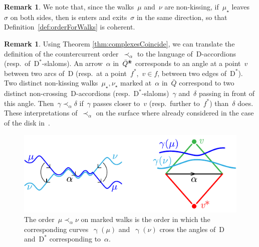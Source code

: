 \documentclass{amsart}
\theoremstyle{definition}
\newtheorem{remark}[theorem]{Remark}
\newcommand{\blossom}{^\text{\ding{96}}} %
\newcommand{\dual}{^*} %
\newcommand{\dissection}{\mathrm{D}} %
\newcommand{\curveof}{\operatorname{\gamma}} %
\begin{document}
\begin{remark}
 We note that, since the walks~$\mu$ and~$\nu$ are non-kissing, if~$\mu_\star$ leaves~$\sigma$ on both sides, then is enters and exits~$\sigma$ in the same direction, so that Definition~\ref{def:orderForWalks} is coherent.
\end{remark}


\begin{remark}
\label{rem:countercurrentOrderOnSurface}
Using Theorem \ref{thm:complexesCoincide}, we can translate the definition of the countercurrent order~$\prec_\alpha$ to the language of~$\dissection$-accordions (resp.~of~$\dissection\dual$-slaloms).
An arrow~$\alpha$ in~$\bar Q\blossom$ corresponds to an angle at a point~$v$ between two arcs of~$\dissection$ (resp.~at a point~$f\dual$,~$v\in f$, between two edges of~$\dissection\dual$).
Two distinct non-kissing walks~$\mu_\star, \nu_\star$ marked at~$\alpha$ in~$\bar Q$ correspond to two distinct non-crossing~$\dissection$-accordions (resp.~$\dissection\dual$-slaloms)~$\gamma$ and~$\delta$ passing in front of this angle.
Then~$\gamma \prec_\alpha \delta$ if~$\gamma$ passes closer to~$v$ (resp.~further to~$f\dual$) than~$\delta$ does.
These interpretations of~$\prec_\alpha$ on the surface where already considered in the case of the disk in~\cite{GarverMcConville, MannevillePilaud-accordion}.
%
\begin{figure}[h]
	\capstart
	\centerline{\includegraphics[scale=1]{orderCurves}}
	\caption{The order~$\mu \prec_\alpha \nu$ on marked walks is the order in which the corresponding curves~$\curveof(\mu)$ and~$\curveof(\nu)$ cross the angles of~$\dissection$ and~$\dissection\dual$ corresponding to~$\alpha$.}
	\label{fig:orderCurves}
\end{figure}
\end{remark}

\end{document}
